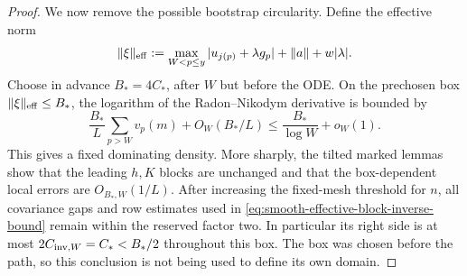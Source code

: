 \documentclass[11pt]{article}
\numberwithin{equation}{section}
\theoremstyle{definition}
\theoremstyle{remark}
\newcommand{\1}{\mathbf 1}
\begin{document}
\begin{proof}
We now remove the possible bootstrap circularity.  Define the effective
norm
\[
 \|\xi\|_{\rm eff}:=
 \max_{W<p\le y}|u_{j(p)}+\lambda g_p|
       +\|a\|+w|\lambda|.
\]
Choose in advance \(B_*=4C_*\), after \(W\) but before the ODE.  On the prechosen box
\(\|\xi\|_{\rm eff}\leq B_*\), the logarithm of the Radon--Nikodym
derivative is bounded by
\[
 \frac{B_*}{L}\sum_{p>W}v_p(m)+O_W(B_*/L)
 \leq\frac{B_*}{\log W}+o_W(1).
\]
This gives a fixed dominating density.  More sharply, the tilted marked
lemmas show that the leading \(h,K\) blocks are unchanged and that the
box-dependent local errors are \(O_{B_*,W}(1/L)\).  After increasing the
fixed-mesh threshold for \(n\), all covariance gaps and row estimates
used in \eqref{eq:smooth-effective-block-inverse-bound} remain within
the reserved factor two.  In particular its right side is at most
\(2C_{{\rm inv},W}=C_*<B_*/2\) throughout this box.  The box was chosen before
the path, so this conclusion is not being used to define its own domain.


\end{proof}
\end{document}
